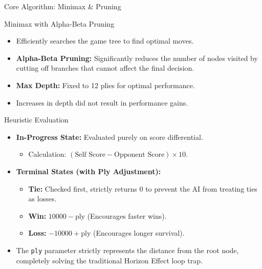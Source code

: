 \documentclass{beamer}
\begin{document}
\begin{frame}{Core Algorithm: Minimax \& Pruning}
    \begin{block}{Minimax with Alpha-Beta Pruning}
        \begin{itemize}
            \item Efficiently searches the game tree to find optimal moves.
            \item \textbf{Alpha-Beta Pruning:} Significantly reduces the number of nodes visited by cutting off branches that cannot affect the final decision.
        \end{itemize}
    \end{block}
    \vfill
    \begin{itemize}
        \item \textbf{Max Depth:} Fixed to 12 plies for optimal performance.
        \item Increases in depth did not result in performance gains.
    \end{itemize}
\end{frame}

\begin{frame}{Heuristic Evaluation}
    \begin{itemize}
        \item \textbf{In-Progress State:} Evaluated purely on score differential.
        \begin{itemize}
            \item Calculation: $(\text{Self Score} - \text{Opponent Score}) \times 10$.
        \end{itemize}
        \item \textbf{Terminal States (with Ply Adjustment):}
        \begin{itemize}
            \item \textbf{Tie:} Checked first, strictly returns 0 to prevent the AI from treating ties as losses.
            \item \textbf{Win:} $10000 - \text{ply}$ (Encourages faster wins).
            \item \textbf{Loss:} $-10000 + \text{ply}$ (Encourages longer survival).
        \end{itemize}
        \item The \texttt{ply} parameter strictly represents the distance from the root node, completely solving the traditional Horizon Effect loop trap.
    \end{itemize}
\end{frame}
\end{document}
